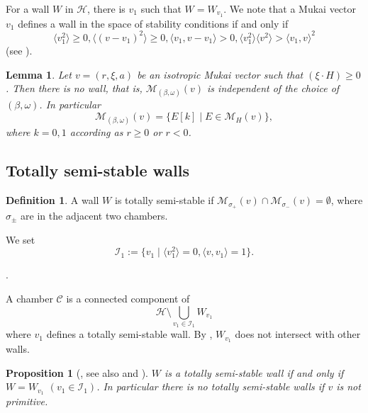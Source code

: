 \documentclass[10pt]{amsart}
\def\cal{\mathcal}
\newenvironment{NB}{
\color{red}{\bf NB}. \footnotesize 
}{}
\numberwithin{equation}{section}
\theoremstyle{plain}
\newtheorem{lem}[thm]{Lemma}
\newtheorem{prop}[thm]{Proposition}
\theoremstyle{definition}
\newtheorem{defn}[thm]{Definition}
\theoremstyle{remark}
\begin{document}
For a wall $W$ in ${\cal H}$,
there is $v_1$ such that $W= W_{v_1}$.  
We note that a Mukai vector $v_1$ defines a wall in the space of stability conditions
if and only if
\begin{equation}\label{eq:def-wall}
\langle v_1^2 \rangle \geq 0, \langle (v-v_1)^2 \rangle \geq 0, \langle v_1,v-v_1 \rangle>0, 
\langle v_1^2 \rangle  \langle v^2 \rangle>\langle v_1,v \rangle^2
\end{equation}
(see \cite[Def. 1.2 and Prop. 1.3]{Y}).


\begin{lem}\label{lem:nowall}
Let $v=(r,\xi,a)$ be an isotropic Mukai vector such that $(\xi \cdot H) \geq 0$.
Then there is no wall, that is, ${\cal M}_{(\beta,\omega)}(v)$ is independent
of the choice of $(\beta,\omega)$.
In particular 
$$
{\cal M}_{(\beta,\omega)}(v)=\{E[k] \mid E \in {\cal M}_H(v) \},
$$
where
$k=0,1$ according as $r \geq 0$ or $r<0$.  
\end{lem}






\subsection{Totally semi-stable walls}\label{subsect:tss-wall}

\begin{defn}
A wall $W$ is totally semi-stable if
${\cal M}_{\sigma_+}(v) \cap {\cal M}_{\sigma_-}(v) =\emptyset$,
where $\sigma_\pm$ are in the adjacent two chambers. 
\end{defn}

We set
$$
{\cal I}_1:=\{ v_1 \mid \langle v_1^2 \rangle=0, \langle v,v_1 \rangle=1 \}.
$$


\begin{NB}
A chamber ${\cal C}$ is a connected component of
$$
{\cal H} \setminus \bigcup_{v_1 \in {\cal I}_1} W_{v_1} 
$$
where $v_1$ defines a totally semi-stable wall.
By \cite[Lem. 3.19]{Y},
$W_{v_1}$ does not intersect with other walls.
\end{NB}




\begin{prop}[{\cite[Thm. 5.3.5]{MYY:2018}, see also \cite[Lem. 5.3.4]{MYY:2018} and \cite[Thm. 4.2]{NY:2020}}]\label{prop:tot-wall}
$W$ is a totally semi-stable wall if and only if $W=W_{v_1}$ $(v_1 \in {\cal I}_1)$.
In particular there is no totally semi-stable walls if $v$ is not primitive.
\end{prop}
\end{document}
